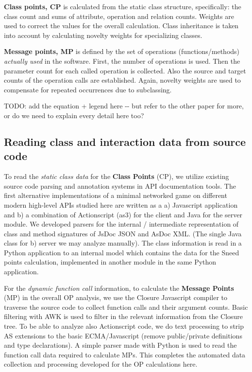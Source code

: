 \documentclass[conference]{IEEEtran}
\begin{document}
\textbf{Class points, CP} is calculated from the static class structure,
specifically: the class count and sums of attribute, operation and
relation counts. Weights are used to correct the values for the
overall calculation. Class inheritance is taken into account by
calculating novelty weights for specializing classes.

\textbf{Message points, MP} is defined by the set of operations
(functions/methods) \emph{actually used} in the software. First, the number
of operations is used. Then the parameter count for each called
operation is collected. Also the source and target counts of the
operation calls are established. Again, novelty weights are used to
compensate for repeated occurrences due to subclassing.

TODO: add the equation + legend here -{}- but refer to the other paper
for more, or do we need to explain every detail here too?


\subsection{Reading class and interaction data from source code%
  \label{reading-class-and-interaction-data-from-source-code}%
}

To read the \emph{static class data} for the \textbf{Class Points} (CP), we
utilize existing source code parsing and annotation systems in API
documentation tools. The first alternative implementations of a
minimal networked game on different modern high-level APIs studied
here are written as a a) Javascript application and b) a combination
of Actionscript (as3) for the client and Java for the server
module. We developed parsers for the internal / intermediate
representation of class and method signatures of JsDoc JSON and
AsDoc XML. (The single Java class for b) server we may analyze
manually). The class information is read in a Python application to an
internal model which contains the data for the Sneed points
calculation, implemented in another module in the same Python
application.

For the \emph{dynamic function call} information, to calculate the
\textbf{Message Points} (MP) in the overall OP analysis, we use the Closure
Javascript compiler to traverse the source code to collect function
calls and their argument counts. Basic filtering with AWK is used to
filter in the relevant information from the Closure tree. To be able
to analyze also Actionscript code, we do text processing to strip AS
extensions to the basic ECMA/Javascript (remove public/private
definitions and type declarations). A simple parser made with Python
is used to read the function call data required to calculate MPs. This
completes the automated data collection and processing developed for
the OP calculations here.
\end{document}
